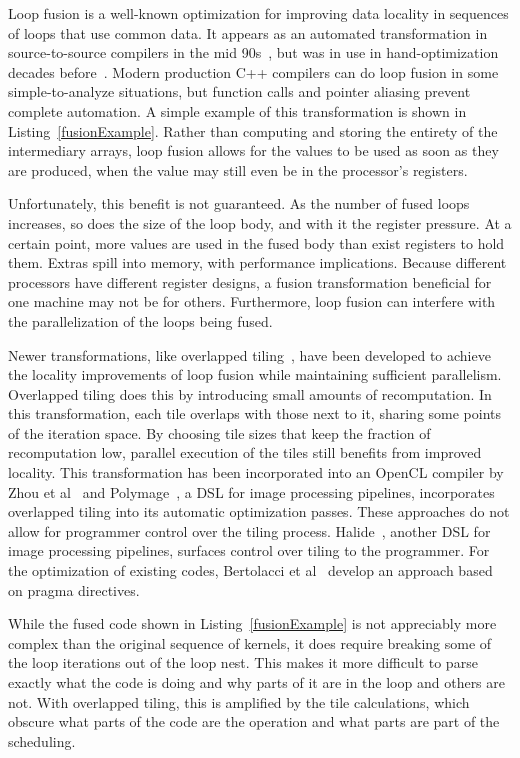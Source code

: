 Loop fusion is a well-known optimization for improving data locality in sequences of loops that use common data.
It appears as an automated transformation in source-to-source compilers in the mid 90s~\cite{mckinley1996improving}, but was in use in hand-optimization decades before~\cite{warren1984hierarchical,cocke1971catalogue}.
Modern production C++ compilers can do loop fusion in some simple-to-analyze situations, but function calls and pointer aliasing prevent complete automation.
A simple example of this transformation is shown in Listing~\ref{fusionExample}.
Rather than computing and storing the entirety of the intermediary arrays, loop fusion allows for the values to be used as soon as they are produced, when the value may still even be in the processor's registers.

Unfortunately, this benefit is not guaranteed.
As the number of fused loops increases, so does the size of the loop body, and with it the register pressure. 
At a certain point, more values are used in the fused body than exist registers to hold them.
Extras spill into memory, with performance implications.
Because different processors have different register designs, a fusion transformation beneficial for one machine may not be for others.
Furthermore, loop fusion can interfere with the parallelization of the loops being fused.

Newer transformations, like overlapped tiling~\cite{holewinski2012high,krishnamoorthy2007effective}, have been developed to achieve the locality improvements of loop fusion while maintaining sufficient parallelism.
Overlapped tiling does this by introducing small amounts of recomputation.
In this transformation, each tile overlaps with those next to it, sharing some points of the iteration space.
By choosing tile sizes that keep the fraction of recomputation low, parallel execution of the tiles still benefits from improved locality.
This transformation has been incorporated into an OpenCL compiler by Zhou et al~\cite{zhou2012hierarchical} and Polymage~\cite{mullapudi2015polymage}, a DSL for image processing pipelines, incorporates overlapped tiling into its automatic optimization passes.
These approaches do not allow for programmer control over the tiling process.
Halide~\cite{ragan-kelley2013halide}, another DSL for image processing pipelines, surfaces control over tiling to the programmer.
For the optimization of existing codes, Bertolacci et al~\cite{bertolacci2019using} develop an approach based on pragma directives.

While the fused code shown in Listing~\ref{fusionExample} is not appreciably more complex than the original sequence of kernels, it does require breaking some of the loop iterations out of the loop nest.
This makes it more difficult to parse exactly what the code is doing and why parts of it are in the loop and others are not.
With overlapped tiling, this is amplified by the tile calculations, which obscure what parts of the code are the operation and what parts are part of the scheduling. 

